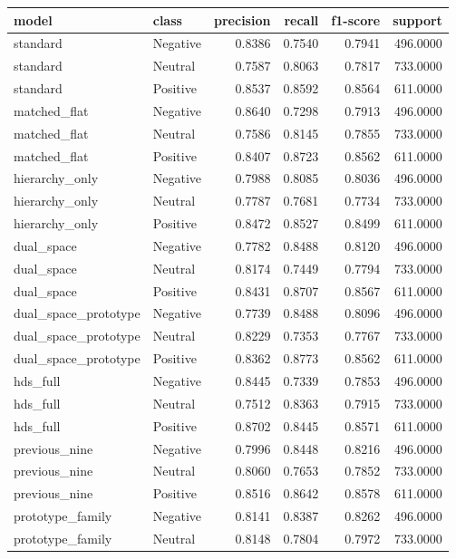 \begin{tabular}{llrrrr}
\toprule
model & class & precision & recall & f1-score & support \\
\midrule
standard & Negative & 0.8386 & 0.7540 & 0.7941 & 496.0000 \\
standard & Neutral & 0.7587 & 0.8063 & 0.7817 & 733.0000 \\
standard & Positive & 0.8537 & 0.8592 & 0.8564 & 611.0000 \\
matched\_flat & Negative & 0.8640 & 0.7298 & 0.7913 & 496.0000 \\
matched\_flat & Neutral & 0.7586 & 0.8145 & 0.7855 & 733.0000 \\
matched\_flat & Positive & 0.8407 & 0.8723 & 0.8562 & 611.0000 \\
hierarchy\_only & Negative & 0.7988 & 0.8085 & 0.8036 & 496.0000 \\
hierarchy\_only & Neutral & 0.7787 & 0.7681 & 0.7734 & 733.0000 \\
hierarchy\_only & Positive & 0.8472 & 0.8527 & 0.8499 & 611.0000 \\
dual\_space & Negative & 0.7782 & 0.8488 & 0.8120 & 496.0000 \\
dual\_space & Neutral & 0.8174 & 0.7449 & 0.7794 & 733.0000 \\
dual\_space & Positive & 0.8431 & 0.8707 & 0.8567 & 611.0000 \\
dual\_space\_prototype & Negative & 0.7739 & 0.8488 & 0.8096 & 496.0000 \\
dual\_space\_prototype & Neutral & 0.8229 & 0.7353 & 0.7767 & 733.0000 \\
dual\_space\_prototype & Positive & 0.8362 & 0.8773 & 0.8562 & 611.0000 \\
hds\_full & Negative & 0.8445 & 0.7339 & 0.7853 & 496.0000 \\
hds\_full & Neutral & 0.7512 & 0.8363 & 0.7915 & 733.0000 \\
hds\_full & Positive & 0.8702 & 0.8445 & 0.8571 & 611.0000 \\
previous\_nine & Negative & 0.7996 & 0.8448 & 0.8216 & 496.0000 \\
previous\_nine & Neutral & 0.8060 & 0.7653 & 0.7852 & 733.0000 \\
previous\_nine & Positive & 0.8516 & 0.8642 & 0.8578 & 611.0000 \\
prototype\_family & Negative & 0.8141 & 0.8387 & 0.8262 & 496.0000 \\
prototype\_family & Neutral & 0.8148 & 0.7804 & 0.7972 & 733.0000 \\

\end{tabular}

